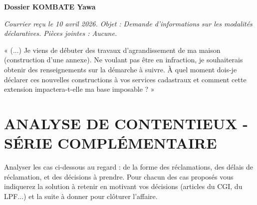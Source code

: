 \documentclass[a4paper, 11pt]{exam}
\begin{document}
\begin{questions}
		\vspace{0.5cm}
		
		\question \textbf{Dossier KOMBATE Yawa}
		
		\textit{Courrier reçu le 10 avril 2026. Objet : Demande d'informations sur les modalités déclaratives. Pièces jointes : Aucune.}
		
		« (...) Je viens de débuter des travaux d'agrandissement de ma maison (construction d'une annexe). Ne voulant pas être en infraction, je souhaiterais obtenir des renseignements sur la démarche à suivre. À quel moment dois-je déclarer ces nouvelles constructions à vos services cadastraux et comment cette extension impactera-t-elle ma base imposable ? »
		
		
	\end{questions}
	
	\section*{ANALYSE DE CONTENTIEUX - SÉRIE COMPLÉMENTAIRE}
	
	Analyser les cas ci-dessous au regard : de la forme des réclamations, des délais de réclamation, et des décisions à prendre. Pour chacun des cas proposés vous indiquerez la solution à retenir en motivant vos décisions (articles du CGI, du LPF...) et la suite à donner pour clôturer l'affaire.
	
\end{document}
